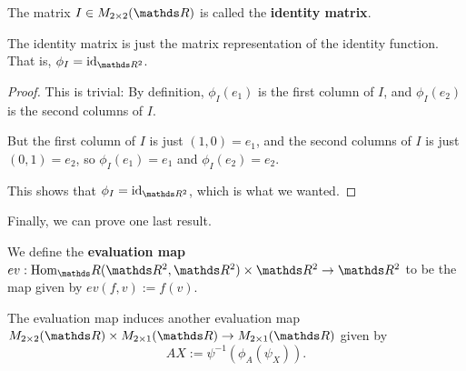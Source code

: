 \begin{df}
	The matrix $I\in M_{2\times 2}(\R)$ is called the \textbf{identity matrix}.
\end{df}

\begin{prop}
	The identity matrix is just the matrix representation of the identity function. That is, $\phi_I=\id_{\R^2}$.
\end{prop}
\begin{proof}
	This is trivial: By definition, $\phi_I(e_1)$ is the first column of $I$, and $\phi_I(e_2)$ is the second columns of $I$.
	
	But the first column of $I$ is just $(1,0)=e_1$, and the second columns of $I$ is just $(0,1)=e_2$, so $\phi_I(e_1)=e_1$ and $\phi_I(e_2)=e_2$.
	
	This shows that $\phi_I=\id_{\R^2}$, which is what we wanted.
\end{proof}

Finally, we can prove one last result.

\begin{df}
	We define the \textbf{evaluation map} $ev:\hom_\R(\R^2,\R^2)\times \R^2\to \R^2$ to be the map given by $ev(f,v):=f(v)$.
\end{df}

\begin{df}
	The evaluation map induces another evaluation map $M_{2\times 2}(\R)\times M_{2\times 1}(\R)\to M_{2\times 1}(\R)$ given by 
	\[AX:=\psi^{-1}(\phi_A(\psi_X)).\]
\end{df}

